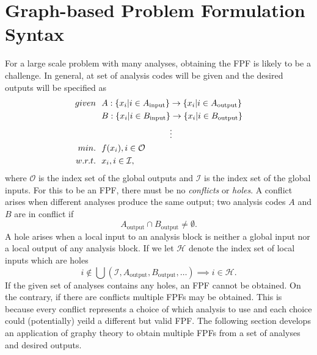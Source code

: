 \section{Graph-based Problem Formulation Syntax}
	For a large scale problem with many analyses, obtaining the FPF is likely to be a challenge. In general, at set of analysis codes will be given and the desired outputs will be specified as
	    \begin{align}
            given & \ \ A: \lbrace x_i \lvert i \in A_\textrm{input} \rbrace \rightarrow \lbrace x_i \lvert i \in A_\textrm{output} \rbrace \notag
            \\    & \ \ B: \lbrace x_i \lvert i \in B_\textrm{input} \rbrace \rightarrow \lbrace x_i \lvert i \in B_\textrm{output} \rbrace \notag
			\\    & \ \ \quad \quad \quad \quad \quad \quad  \quad \quad \vdots
            \\min. &\ \ f(x_i), i \in \mathcal{O} \notag
            \\w.r.t. & \ \ x_i, i \in \mathcal{I}, \notag
            \label{eqn:preFPF}
        \end{align}
	where $\mathcal{O}$ is the index set of the global outputs and $\mathcal{I}$ is the index set of the global inputs. For this to be an FPF, there must be no \emph{conflicts} or \emph{holes}. A conflict arises when different analyses produce the same output; two analysis codes $A$ and $B$ are in conflict if
		\begin{equation}
			A_\textrm{output} \cap B_\textrm{output} \neq \emptyset.
		\end{equation}
	A hole arises when a local input to an analysis block is neither a global input nor a local output of any analysis block. If we let $\mathcal{H}$ denote the index set of local inputs which are holes
		\begin{equation}
			i \notin \bigcup (\mathcal{I},A_\textrm{output},B_\textrm{output},\ldots)  \implies  i \in \mathcal{H}.
		\end{equation}
	If the given set of analyses contains any holes, an FPF cannot be obtained. On the contrary, if there are conflicts multiple FPFs may be obtained. This is because every conflict represents a choice of which analysis to use and each choice could (potentially) yeild a different but valid FPF. The following section develops an application of graphy theory to obtain multiple FPFs from a set of analyses and desired outputs.
		
